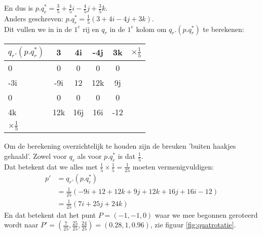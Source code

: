 En dus is $ p.q^*_r = \frac{3}{5}  + \frac{4}{5}i - \frac{4}{5}j  + \frac{3}{5}k. $
\\Anders geschreven:  $ p.q^*_r = \frac{1}{5}  (3 + 4i - 4j  + 3k). $ 
\\Dit vullen we  in in de $ 1^e $ rij en $ q_r $ in de $ 1^e  $ kolom om $ q_r.(p.q^*_r) $ te berekenen:\\
\begin{center}
	\begin{tabular}{ | l || c | c |c |c |l}
		\hline
		$ q_r.(p.q^*_r) $  & 3 & 4i   & -4j & 3k &  $ \times  \frac{1}{5} $\\ \hline \hline
		0                         & 0    & 0    & 0       & 0 & \\ \hline
		-3i                      & -9i   & 12  & 12k    & 9j & \\ \hline
		0                         & 0    &  0   & 0       & 0&\\ \hline
		4k                       & 12k & 16j  & 16i   & -12 & \\ 
		\hline 
		$ \times  \frac{1}{5} $
	\end{tabular}
\end{center}
Om de berekening overzichtelijk te houden zijn de breuken 'buiten haakjes gehaald'. Zowel voor $ q_r $ als voor $ p.q^*_r $ is dat $  \frac{1}{5}. $ 
\\Dat betekent dat we alles met $  \frac{1}{5} \times  \frac{1}{5}  =  \frac{1}{25} $ moeten vermenigvuldigen: 
\begin{align*}
p' &=  q_r.(p.q^*_r)  \\
&=  \frac{1}{25}(-9i + 12 +12k + 9j + 12k + 16j + 16i -  12)  \\
& = \frac{1}{25} (7i + 25j +  24k  )
\end{align*}
En dat betekent dat het punt $ P=(-1,-1,0)  $ waar we mee begonnen  geroteerd wordt naar $ P'=  (\frac{7}{25}, \frac{25}{25}, \frac{24}{25}) =(0.28,1,0.96)  $, zie  figuur \ref{fig:quatrotatie}.

